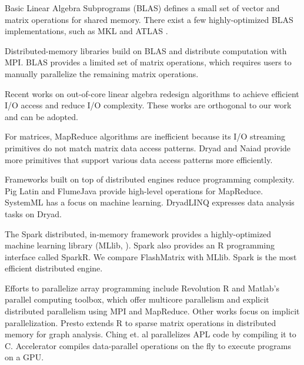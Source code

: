Basic Linear Algebra Subprograms (BLAS) defines a small set of vector and
matrix operations for shared memory. There exist a few highly-optimized BLAS
implementations, such as MKL \cite{mkl} and ATLAS \cite{atlas}. 

Distributed-memory libraries \cite{trilinos, petsc, elemental}
build on BLAS and distribute computation with MPI.
BLAS provides a limited set of matrix operations, which requires
users to manually parallelize the remaining matrix operations.

Recent works on out-of-core linear algebra \cite{Toledo99, Quintana-Orti12}
redesign algorithms to achieve efficient I/O access and reduce I/O
complexity. These works are orthogonal to our work and can be adopted.

For matrices, MapReduce \cite{mapreduce} algorithms are inefficient because 
its I/O streaming primitives do not match matrix data access patterns.
Dryad \cite{dryad} and Naiad \cite{naiad} provide more primitives 
that support various data access patterns more efficiently.

Frameworks built on top of distributed engines reduce programming complexity.
Pig Latin \cite{pig} and FlumeJava \cite{flumejava}
provide high-level operations for MapReduce.
SystemML \cite{systemml} has a focus on machine learning. 
DryadLINQ \cite{dryadlinq} expresses data analysis tasks on Dryad. 

The Spark \cite{spark} distributed, in-memory framework
provides a highly-optimized machine learning library (MLlib, \cite{mllib}).
Spark also provides an R programming interface called SparkR.  
We compare FlashMatrix with MLlib. Spark is the most efficient distributed engine.

Efforts to parallelize array programming include
Revolution R \cite{rre} and Matlab's parallel computing toolbox, which
offer multicore parallelism and explicit distributed parallelism using MPI and MapReduce. 
Other works focus on implicit parallelization.
Presto \cite{presto} extends R to sparse matrix operations in distributed memory for graph
analysis. Ching et. al \cite{Ching12} parallelizes APL code by
compiling it to C. Accelerator \cite{accelerator} compiles
data-parallel operations on the fly to execute programs on a GPU.
